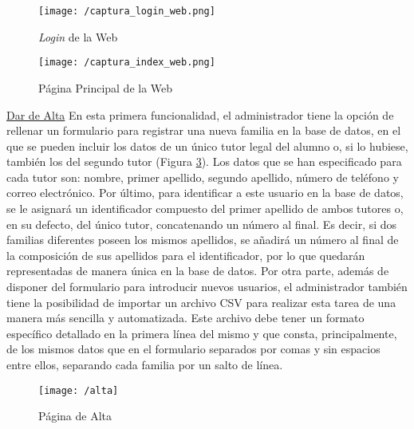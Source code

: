 \begin{figure}[!h]
	\begin{center}
		\texttt{[image: /captura\_login\_web.png]}
		\caption{\textit{Login} de la Web}
		\label{fig:login_web}
	\end{center}
\end{figure}

\begin{figure}[!h]
	\begin{center}
		\texttt{[image: /captura\_index\_web.png]}
		\caption{Página Principal de la Web}
		\label{fig:index_web}
	\end{center}
\end{figure}

\newpage

\noindent \underline{Dar de Alta} \newline
En esta primera funcionalidad, el administrador tiene la opción de rellenar un formulario para registrar una nueva familia en la base de datos, en el que se pueden incluir los datos de un único tutor legal del alumno o, si lo hubiese, también los del segundo tutor (Figura \ref{fig:alta}). Los datos que se han especificado para cada tutor son: nombre, primer apellido, segundo apellido, número de teléfono y correo electrónico. Por último, para identificar a este usuario en la base de datos, se le asignará un identificador compuesto del primer apellido de ambos tutores o, en su defecto, del único tutor, concatenando un número al final. Es decir, si dos familias diferentes poseen los mismos apellidos, se añadirá un número al final de la composición de sus apellidos para el identificador, por lo que quedarán representadas de manera única en la base de datos. Por otra parte, además de disponer del formulario para introducir nuevos usuarios, el administrador también tiene la posibilidad de importar un archivo \acs{CSV} para realizar esta tarea de una manera más sencilla y automatizada. Este archivo debe tener un formato específico detallado en la primera línea del mismo y que consta, principalmente, de los mismos datos que en el formulario separados por comas y sin espacios entre ellos, separando cada familia por un salto de línea.

\clearpage

\begin{figure}[!h]
	\begin{center}
		\texttt{[image: /alta]}
		\caption{Página de Alta}
		\label{fig:alta}
	\end{center}
\end{figure}

